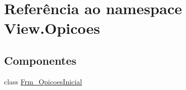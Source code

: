 \hypertarget{namespace_view_1_1_opicoes}{}\section{Referência ao namespace View.\+Opicoes}
\label{namespace_view_1_1_opicoes}
\subsection*{Componentes}
\begin{DoxyCompactItemize}
\item 
class \hyperlink{class_view_1_1_opicoes_1_1_frm___opicoes_inicial}{Frm\+\_\+\+Opicoes\+Inicial}
\end{DoxyCompactItemize}
